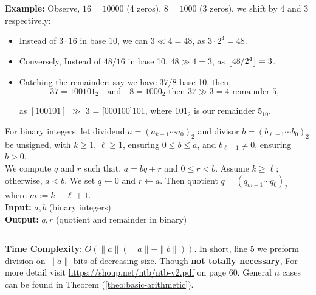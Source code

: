 \newpage
\noindent
\textbf{Example:} Observe, $16=10000$ (4 zeros), $8=1000$ (3 zeros), we shift by 4 and 3 respectively:
\begin{itemize}
    \item Instead of $3 \cdot 16$ in base 10, we can $3 \ll 4=48$, as $3 \cdot 2^4 = 48$.
    \item Conversely, Instead of $48/16$ in base 10, $48 \gg 4 = 3$, as $\floor*{48/2^4} = 3$.
    \item Catching the remainder: say we have $37/8$ base 10, then,
        \[ 37 = 100101_2 \quad \text{and} \quad 8 = 1000_2 \text{ then } 37 \gg 3 = 4 \text{ remainder } 5,\]

    \noindent    
    as  $[100101]$ $\gg$ 3 = [000100]101, where $101_2$ is our remainder $5_{10}$.
\end{itemize}

\begin{Func}

    \label{func:QuoRem}

    For binary integers, let dividend $a = (a_{k-1} \cdots a_0)_2$ and divisor $b = (b_{\ell-1} \cdots b_0)_2$ be unsigned, with $k \geq 1$,
    $\ell \geq 1$, ensuring $0 \leq b \leq a$, and $b_{\ell-1} \neq 0$, ensuring $b > 0$.\\ 
    
    \noindent
    We compute $q$ and $r$ such that, $a = bq + r$ and $0 \leq r < b$. 
    Assume $k \geq \ell$; otherwise, $a < b$. We set $q \gets 0$ and $r \gets a$. 
    Then quotient $q = (q_{m-1} \cdots q_0)_2$ where $m := k - \ell + 1$.\\

    \noindent
    \textbf{Input:} $a, b$ (binary integers)\\
    \noindent
    \textbf{Output:} $q, r$ (quotient and remainder in binary)\\
    \begin{algorithm}[H]
        \SetAlgoLined
    \end{algorithm}
    \noindent\rule{\textwidth}{0.4pt}
    \noindent

    \noindent
    \textbf{Time Complexity}: $O(\|a\|(\|a\| - \|b\|))$. In short, line 5 we preform division on $\|a\|$ bits of decreasing size. 
    Though \textbf{not totally necessary}, For more
    detail visit \url{https://shoup.net/ntb/ntb-v2.pdf} on page 60. General $n$ cases can be found in Theorem (\ref{theo:basic-arithmetic}).
\end{Func}

